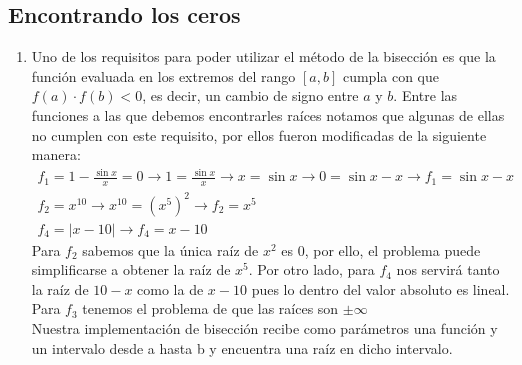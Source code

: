 \documentclass[spanish, fleqn]{article}
\begin{document}
	\subsection{Encontrando los ceros}
	\begin{enumerate}
		\item
			Uno de los requisitos para poder utilizar el método de la bisección
			es que la función evaluada en los extremos del rango $[a,b]$ cumpla
			con que $f(a)\cdot f(b)<0$, es decir, un cambio de signo entre $a$ 
			y $b$. Entre las funciones a las que debemos encontrarles raíces
			notamos que algunas de ellas no cumplen con este requisito, por
			ellos fueron modificadas de la siguiente manera:
			\newcommand{\ra}{\rightarrow}
			\begin{gather*}
				f_1 = 	1 - \frac{\sin{x}}{x} = 0 \ra 1 = \frac{\sin{x}}{x} \ra
				x = \sin{x} \ra 0 = \sin{x} - x \ra f_1 = \sin{x} - x \\
				f_2 = x^{10} \ra x^{10} = (x^5)^2 \ra f_2 = x^5\\
				f_4 = | x - 10 | \ra f_4 = x - 10
			\end{gather*}
			Para $f_2$ sabemos que la única raíz de $x^2$ es $0$, por ello, el
			problema puede simplificarse a obtener la raíz de $x^5$. Por otro
			lado, para $f_4$ nos servirá tanto la raíz de $10-x$ como la de 
			$x-10$ pues lo dentro del valor absoluto es lineal.
			Para $f_3$ tenemos el problema de que las raíces son $\pm\infty$\\
			Nuestra implementación de bisección recibe como parámetros una
			función y un intervalo desde \textsf{a} hasta \textsf{b} y
			encuentra una raíz en dicho intervalo.


\end{enumerate}
\end{document}
